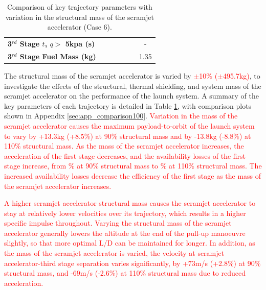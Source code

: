 \begin{table}[ht]
\begin{tabular}{l c c c c c c}
		\\
		\textbf{3$^{rd}$ Stage $t$, $q >$ 5kpa (s)}
		& \thirdqOverFivemSPARTANNinetyNoReturn
		& \thirdqOverFivemSPARTANNinetyFiveNoReturn
		& \thirdqOverFivemSPARTANStandardNoReturn
		& \thirdqOverFivemSPARTANOneHundredFiveNoReturn
		& \thirdqOverFivemSPARTANOneHundredTenNoReturn
		& -
		\\
		\textbf{3$^{rd}$ Stage Fuel Mass (kg)}
		& \thirdmFuelmSPARTANNinetyNoReturn
		& \thirdmFuelmSPARTANNinetyFiveNoReturn
		& \thirdmFuelmSPARTANStandardNoReturn
		& \thirdmFuelmSPARTANOneHundredFiveNoReturn
		& \thirdmFuelmSPARTANOneHundredTenNoReturn
		&1.35
		\\
		\hline 
	\end{tabular} 
\caption{Comparison of key trajectory parameters with variation in the structural mass of the scramjet accelerator (Case 6).}
\label{tab:comparison100}
	
\end{table}



The structural mass of the scramjet accelerator is varied by \textcolor{red}{$\pm$10\% ($\pm$495.7kg)}, to investigate the effects of the structural, thermal shielding, and system mass of the scramjet accelerator on the performance of the launch system. A summary of the key parameters of each trajectory is detailed in Table \ref{tab:comparison100}, with comparison plots shown in Appendix \ref{sec:app_comparison100}.
\textcolor{red}{Variation in the mass of the scramjet accelerator causes the maximum payload-to-orbit of the launch system to vary by +13.3kg (+8.5\%) at 90\% structural mass and by -13.8kg (-8.8\%) at 110\% structural mass. 
 As the mass of the scramjet accelerator increases, the acceleration of the first stage decreases, and the availability losses of the first stage increase, from \PlossonemSPARTANNinetyNoReturn\% at 90\% structural mass to \PlossonemSPARTANOneHundredTenNoReturn\% at 110\% structural mass. The increased availability losses decrease the efficiency of the first stage as the mass of the scramjet accelerator increases.}

\textcolor{red}{
A higher scramjet accelerator structural mass causes the scramjet accelerator to stay at relatively lower velocities over its trajectory, which results in a higher specific impulse throughout. 
Varying the structural mass of the scramjet accelerator generally lowers the altitude at the end of the pull-up manoeuvre slightly, so that more optimal L/D can be maintained for longer. In addition, as the mass of the scramjet accelerator is varied, the velocity at scramjet accelerator-third stage separation varies significantly, by +73m/s (+2.8\%) at 90\% structural mass, and -69m/s (-2.6\%) at 110\% structural mass due to reduced acceleration. }

